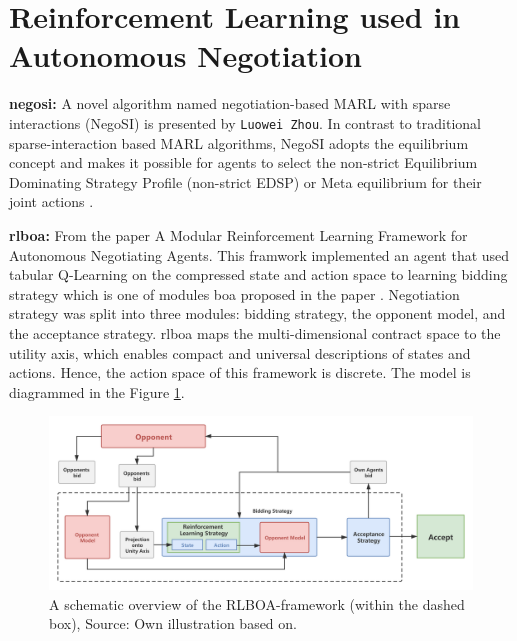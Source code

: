 \section{Reinforcement Learning used in Autonomous Negotiation}
\textbf{\gls{negosi}:} A novel algorithm named negotiation-based MARL
with sparse interactions (NegoSI) is presented by \texttt{Luowei Zhou}. In contrast to traditional sparse-interaction based MARL algorithms, NegoSI adopts the equilibrium concept and makes it possible for agents to select the non-strict Equilibrium Dominating Strategy Profile (non-strict EDSP) or Meta equilibrium for their joint actions \parencite{L2017NegoSI}.


\textbf{\gls{rlboa}:} From the paper \parencite{Bakker2019RLBOAAM} A Modular Reinforcement Learning Framework for Autonomous Negotiating Agents. This framwork implemented an agent that used tabular Q-Learning on the compressed state and action space to learning bidding strategy which is one of modules \gls{boa} proposed in the paper \parencite{Baarslag2014}. Negotiation strategy was split into three modules: bidding strategy, the opponent model, and the acceptance strategy. \gls{rlboa} maps the multi-dimensional contract space to the utility axis, which enables compact and universal descriptions of states and actions. Hence, the action space of this framework is discrete. The model is diagrammed in the Figure \ref{fig:rlboa}.

\begin{figure}[htbp]
\centering
\includegraphics[width=1.0\textwidth]{./images/rlboa.png}
\caption{A schematic overview of the RLBOA-framework (within the dashed box), Source: Own illustration based
on\parencite{Bakker2019RLBOAAM}.}
\label{fig:rlboa}
\end{figure}


